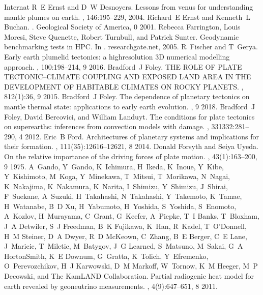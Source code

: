 \documentclass[letterpaper,10pt,english]{jupyterBook}
\begin{document}
\begin{sphinxthebibliography}{Internat}
R E Ernst and D W Desnoyers. Lessons from venus for understanding mantle plumes on earth. , 146:195–229, 2004.
\sphinxAtStartPar
Richard E Ernst and Kenneth L Buchan. . Geological Society of America, 0 2001.
\sphinxAtStartPar
Rebecca Farrington, Louis Moresi, Steve Quenette, Robert Turnbull, and Patrick Sunter. Geodynamic benchmarking tests in HPC. In . researchgate.net, 2005.
\sphinxAtStartPar
R Fischer and T Gerya. Early earth plume\sphinxhyphen{}lid tectonics: a high\sphinxhyphen{}resolution 3D numerical modelling approach. , 100:198–214, 9 2016.
\sphinxAtStartPar
Bradford J Foley. THE ROLE OF PLATE TECTONIC–CLIMATE COUPLING AND EXPOSED LAND AREA IN THE DEVELOPMENT OF HABITABLE CLIMATES ON ROCKY PLANETS. , 812(1):36, 9 2015.
\sphinxAtStartPar
Bradford J Foley. The dependence of planetary tectonics on mantle thermal state: applications to early earth evolution. , 9 2018.
\sphinxAtStartPar
Bradford J Foley, David Bercovici, and William Landuyt. The conditions for plate tectonics on super\sphinxhyphen{}earths: inferences from convection models with damage. , 331\sphinxhyphen{}332:281–290, 4 2012.
\sphinxAtStartPar
Eric B Ford. Architectures of planetary systems and implications for their formation. , 111(35):12616–12621, 8 2014.
\sphinxAtStartPar
Donald Forsyth and Seiya Uyeda. On the relative importance of the driving forces of plate motion. , 43(1):163–200, 9 1975.
\sphinxAtStartPar
A Gando, Y Gando, K Ichimura, H Ikeda, K Inoue, Y Kibe, Y Kishimoto, M Koga, Y Minekawa, T Mitsui, T Morikawa, N Nagai, K Nakajima, K Nakamura, K Narita, I Shimizu, Y Shimizu, J Shirai, F Suekane, A Suzuki, H Takahashi, N Takahashi, Y Takemoto, K Tamae, H Watanabe, B D Xu, H Yabumoto, H Yoshida, S Yoshida, S Enomoto, A Kozlov, H Murayama, C Grant, G Keefer, A Piepke, T I Banks, T Bloxham, J A Detwiler, S J Freedman, B K Fujikawa, K Han, R Kadel, T O'Donnell, H M Steiner, D A Dwyer, R D McKeown, C Zhang, B E Berger, C E Lane, J Maricic, T Miletic, M Batygov, J G Learned, S Matsuno, M Sakai, G A Horton\sphinxhyphen{}Smith, K E Downum, G Gratta, K Tolich, Y Efremenko, O Perevozchikov, H J Karwowski, D M Markoff, W Tornow, K M Heeger, M P Decowski, and The KamLAND Collaboration. Partial radiogenic heat model for earth revealed by geoneutrino measurements. , 4(9):647–651, 8 2011.

\end{sphinxthebibliography}
\end{document}
